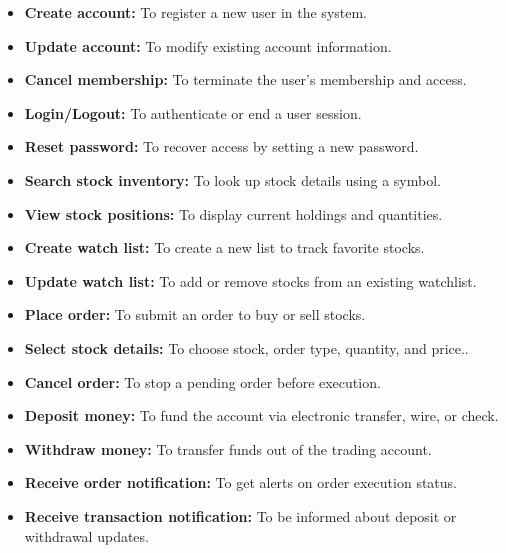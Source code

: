\begin{itemize}
\item
\protect{}\label{NGKfZEoMWdx-yqdWxMDxv}
\textbf{Create account:} To register a new user in the system.
\item
\protect{}\label{3u-n7wgaelweLTcjNsjV6}
\textbf{Update account:} To modify existing account information.
\item
\protect{}\label{fp5yZAI1-4tIDc5j7LXSp}
\textbf{Cancel membership:} To terminate the user's membership and access.
\item
\protect{}\label{8mlv8oucXZEEDovjU5gB5}
\textbf{Login/Logout:} To authenticate or end a user session.
\item
\protect{}\label{l6VgcU3ppIqJ39WPM9aES}
\textbf{Reset password:} To recover access by setting a new password.
\item
\protect{}\label{U7MnGcZ6mKxjhazbiyOZ-}
\textbf{Search stock inventory:} To look up stock details using a symbol.
\item
\protect{}\label{7McJlPQdiWaYO0HYVAE8Y}
\textbf{View stock positions:} To display current holdings and quantities.
\item
\protect{}\label{iP5mVSUXID0a7MlrAer1e}
\textbf{Create watch list:} To create a new list to track favorite stocks.
\item
\protect{}\label{V7q-hrctuNHWPF4gt2Qk6}
\textbf{Update watch list:} To add or remove stocks from an existing watchlist.
\item
\protect{}\label{EHtWwfU9KvLtbfItEn8hL}
\textbf{Place order:} To submit an order to buy or sell stocks.
\item
\protect{}\label{C2jfGzKuYJh0ga6kNYozQ}
\textbf{Select stock details:} To choose stock, order type, quantity, and price..
\item
\protect{}\label{ooMjR4_q-zMmxsj6DPlxO}
\textbf{Cancel order:} To stop a pending order before execution.
\item
\protect{}\label{LL4yq85OmwvIRHoKNNV-X}
\textbf{Deposit money:} To fund the account via electronic transfer, wire, or check.
\item
\protect{}\label{gbHDVUhCR7a3HnWTpmWDB}
\textbf{Withdraw money:} To transfer funds out of the trading account.
\item
\protect{}\label{pfRVzfopksN7UG8UzFFOT}
\textbf{Receive order notification:} To get alerts on order execution status.
\item
\protect{}\label{Udqk4bB9QqfEoHAz-y8yl}
\textbf{Receive transaction notification:} To be informed about deposit or withdrawal updates.
\end{itemize}

